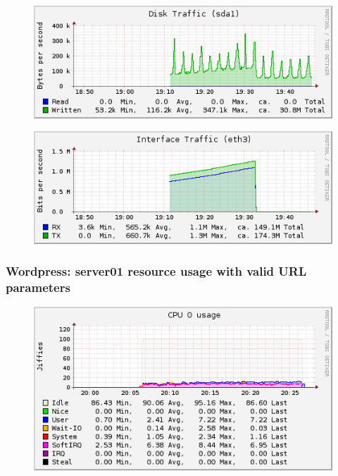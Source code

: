 \documentclass[Measurement results]{subfiles}
\begin{document}
\begin{figure}[H]
\centering
\includegraphics[scale=0.7]{images/results/wp_with_naxsi_incremented_allowed_parameters/disk.png}
\end{figure}

\begin{figure}[H]
\centering
\includegraphics[scale=0.7]{images/results/wp_with_naxsi_incremented_allowed_parameters/interface.png}
\end{figure}

\subsubsection{Wordpress: server01 resource usage with valid URL parameters}
\begin{figure}[H]
\centering
\includegraphics[scale=0.7]{images/results/wp_with_naxsi_incremented_disallowed_parameters/cpu.png}
\end{figure}
\end{document}
